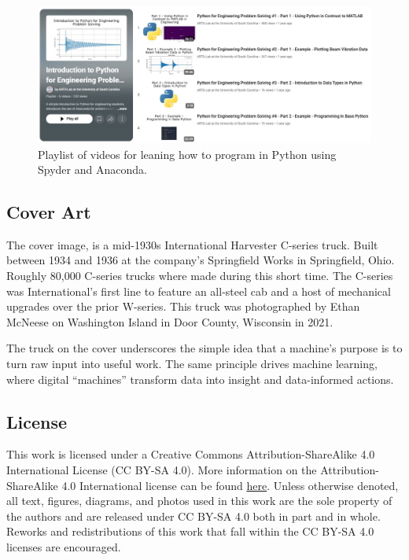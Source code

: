\documentclass[12pt,letter]{article}
\begin{document}
\begin{figure}[H]
	\centering
	\includegraphics[width=6.0in]{figures/python_playlist}
	\vspace{-0.5ex}
	\caption{Playlist of videos for leaning how to program in Python using Spyder and Anaconda.}
	\label{fig:python_playlist}
	\vspace{-1.5ex}
\end{figure} 


\pagebreak
\clearpage                 %
\thispagestyle{noRhead}    %

\vspace{-0.5ex}
\subsection{Cover Art}
\vspace{-1ex}
The cover image, is a mid-1930s International Harvester C-series truck. Built between 1934 and 1936 at the company's Springfield Works in Springfield, Ohio. Roughly 80,000 C-series trucks where made during this short time. The C-series was International's first line to feature an all-steel cab and a host of mechanical upgrades over the prior W-series. This truck was photographed by Ethan McNeese on Washington Island in Door County, Wisconsin in 2021.

The truck on the cover underscores the simple idea that a machine's purpose is to turn raw input into useful work. The same principle drives machine learning, where digital ``machines'' transform data into insight and data-informed actions.



\vspace{-0.5ex}
\subsection{License}
\vspace{-1ex}
This work is licensed under a Creative Commons Attribution-ShareAlike 4.0 International License (CC BY-SA 4.0). More information on the Attribution-ShareAlike 4.0 International license can be found 
\href{https://creativecommons.org/licenses/by-sa/4.0/}{here}.
Unless otherwise denoted, all text, figures, diagrams, and photos used in this work are the sole property of the authors and are released under CC BY-SA 4.0 both in part and in whole. Reworks and redistributions of this work that fall within the CC BY-SA 4.0 licenses are encouraged.
\end{document}
